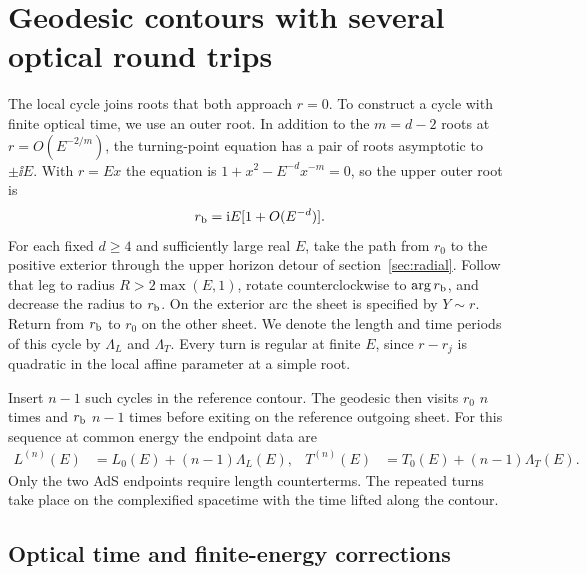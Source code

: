 \section{Geodesic contours with several optical round trips}
\label{sec:optical-cycles}

The local cycle joins roots that both approach \(r=0\). To construct
a cycle with finite optical time, we use an outer root.
In addition to the \(m=d-2\) roots at
\(r=O(E^{-2/m})\), the turning-point equation has a pair of roots
asymptotic to \(\pm\ii E\). With \(r=E x\) the equation is
\(1+x^2-E^{-d}x^{-m}=0\), so the upper outer root is
\begin{equation}
 r_{\rm b}=\mathrm{i} E[1+O(E^{-d})].
\end{equation}
For each fixed \(d\geq4\) and sufficiently large real \(E\), take the
path from \(r_0\) to the positive exterior through the upper horizon
detour of section~\ref{sec:radial}. Follow that leg to radius
\(R>2\max(E,1)\), rotate counterclockwise to \(\arg r_{\rm b}\), and
decrease the radius to \(r_{\rm b}\). On the exterior arc the
sheet is specified by \(Y\sim r\). Return from \(r_{\rm b}\)
to \(r_0\) on the other sheet. We denote the length and time
periods of this cycle by \(\Lambda_L\) and \(\Lambda_T\).
Every turn is regular at finite \(E\), since \(r-r_j\) is
quadratic in the local affine parameter at a simple root.

Insert \(n-1\) such cycles in the reference contour. The geodesic
then visits \(r_0\) \(n\) times and \(r_{\rm b}\) \(n-1\) times
before exiting on the reference outgoing sheet. For this sequence
at common energy the endpoint data are
\begin{align}
 L^{(n)}(E)&=L_0(E)+(n-1)\Lambda_L(E),&
 T^{(n)}(E)&=T_0(E)+(n-1)\Lambda_T(E).
 \label{eq:optical-insertions}
\end{align}
Only the two AdS endpoints require length counterterms. The repeated
turns take place on the complexified spacetime with the time lifted
along the contour.

\subsection{Optical time and finite-energy corrections}

